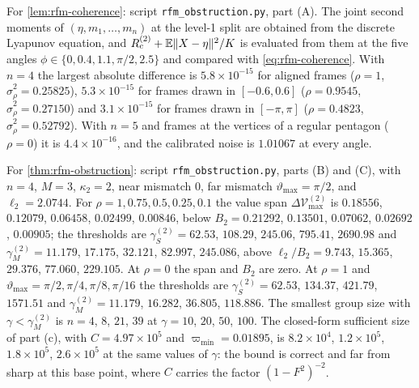 \begin{numcheck}\label{chk:rfm-coherence}
For \cref{lem:rfm-coherence}: script \texttt{rfm\_\allowbreak obstruction.py}, part (A). The joint second moments of $(\eta,m_1,\dots,m_n)$ at the level-1 split are obtained from the discrete Lyapunov equation, and $R_c^{(2)}+\mathbb{E}\|X-\eta\|^2/K$ is evaluated from them at the five angles $\phi\in\{0,0.4,1.1,\pi/2,2.5\}$ and compared with \eqref{eq:rfm-coherence}. With $n=4$ the largest absolute difference is $5.8\times10^{-15}$ for aligned frames ($\rho=1$, $\hat\sigma^2_\rho=0.25825$), $5.3\times10^{-15}$ for frames drawn in $[-0.6,0.6]$ ($\rho=0.9545$, $\hat\sigma_\rho^2=0.27150$) and $3.1\times10^{-15}$ for frames drawn in $[-\pi,\pi]$ ($\rho=0.4823$, $\hat\sigma_\rho^2=0.52792$). With $n=5$ and frames at the vertices of a regular pentagon ($\rho=0$) it is $4.4\times10^{-16}$, and the calibrated noise is $1.01067$ at every angle.
\end{numcheck}

\begin{numcheck}\label{chk:rfm-obstruction}
For \cref{thm:rfm-obstruction}: script \texttt{rfm\_\allowbreak obstruction.py}, parts (B) and (C), with $n=4$, $M=3$, $\kappa_2=2$, near mismatch $0$, far mismatch $\vartheta_{\max}=\pi/2$, and $\ell_2=2.0744$. For $\rho=1,0.75,0.5,0.25,0.1$ the value span $\Delta\mathcal V^{(2)}_{\max}$ is $0.18556$, $0.12079$, $0.06458$, $0.02499$, $0.00846$, below $B_2=0.21292$, $0.13501$, $0.07062$, $0.02692$, $0.00905$; the thresholds are $\gamma_S^{(2)}=62.53$, $108.29$, $245.06$, $795.41$, $2690.98$ and $\gamma_M^{(2)}=11.179$, $17.175$, $32.121$, $82.997$, $245.086$, above $\ell_2/B_2=9.743$, $15.365$, $29.376$, $77.060$, $229.105$. At $\rho=0$ the span and $B_2$ are zero. At $\rho=1$ and $\vartheta_{\max}=\pi/2,\pi/4,\pi/8,\pi/16$ the thresholds are $\gamma_S^{(2)}=62.53$, $134.37$, $421.79$, $1571.51$ and $\gamma_M^{(2)}=11.179$, $16.282$, $36.805$, $118.886$. The smallest group size with $\gamma<\gamma_M^{(2)}$ is $n=4$, $8$, $21$, $39$ at $\gamma=10$, $20$, $50$, $100$. The closed-form sufficient size of part (c), with $C=4.97\times10^5$ and $\varpi_{\min}=0.01895$, is $8.2\times10^4$, $1.2\times10^5$, $1.8\times10^5$, $2.6\times10^5$ at the same values of $\gamma$: the bound is correct and far from sharp at this base point, where $C$ carries the factor $(1-F^2)^{-2}$.
\end{numcheck}

